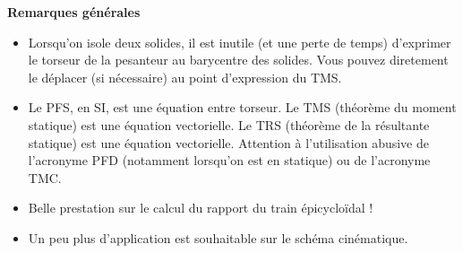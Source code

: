 \documentclass[10pt,fleqn]{book} %
\begin{document}
\textbf{Remarques générales}
\begin{itemize}
\item Lorsqu'on isole deux solides, il est inutile (et une perte de temps) d'exprimer le torseur de la pesanteur au barycentre des solides. Vous pouvez diretement le déplacer (si nécessaire) au point d'expression du TMS.
\item Le PFS, en SI, est une équation entre torseur. Le TMS (théorème du moment statique) est une équation vectorielle. Le TRS (théorème de la résultante statique) est une équation vectorielle. Attention à l'utilisation abusive de l'acronyme PFD (notamment lorsqu'on est en statique) ou de l'acronyme TMC. 
\item Belle prestation sur le calcul du rapport du train épicycloïdal !
\item Un peu plus d'application est souhaitable sur le schéma cinématique. 
\end{itemize}
%


\end{document}
